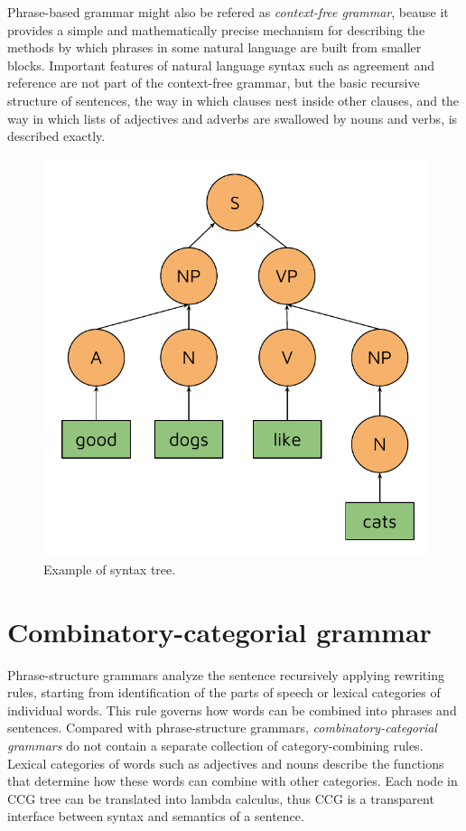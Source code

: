 Phrase-based grammar might also be refered as \emph{context-free grammar}, beause it provides a simple and mathematically precise mechanism for describing the methods by which phrases in some natural language are built from smaller blocks. Important features of natural language syntax such as agreement and reference are not part of the context-free grammar, but the basic recursive structure of sentences, the way in which clauses nest inside other clauses, and the way in which lists of adjectives and adverbs are swallowed by nouns and verbs, is described exactly.

\begin{figure}
\centering
\includegraphics{Figures/syntaxtree}
\decoRule
\caption[Syntax tree]{Example of syntax tree.}
\label{fig:syntax_tree}
\end{figure}

\section{Combinatory-categorial grammar}
Phrase-structure grammars analyze the sentence recursively applying rewriting rules, starting from identification of the parts of speech or lexical categories of individual words. This rule governs how words can be combined into phrases and sentences. Compared with phrase-structure grammars, \emph{combinatory-categorial grammars} do not contain a separate collection of category-combining rules. Lexical categories of words such as adjectives and nouns describe the functions that determine how these words can combine with other categories. Each node in CCG tree can be translated into lambda calculus, thus CCG is a transparent interface between syntax and semantics of a sentence. 

